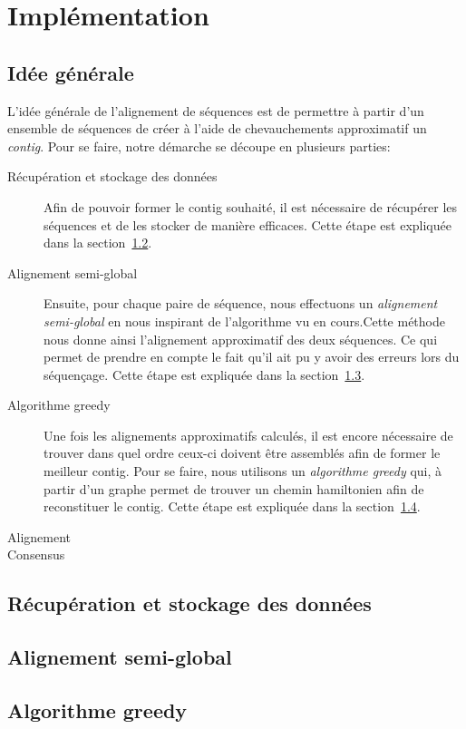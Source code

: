 \section{Implémentation}

\subsection{Idée générale}

	L'idée générale de l'alignement de séquences est de permettre à partir d'un ensemble de séquences de créer à l'aide de chevauchements approximatif un \emph{contig}. Pour se faire, notre démarche se découpe en plusieurs parties:
	
	\begin{description}
		\item[Récupération et stockage des données] Afin de pouvoir former le contig souhaité, il est nécessaire de récupérer les séquences et de les stocker de manière efficaces. Cette étape est expliquée dans la section~\ref{subsection:recStock}.
		
		\item[Alignement semi-global] Ensuite, pour chaque paire de séquence, nous effectuons un \emph{alignement semi-global} en nous inspirant de l'algorithme vu en cours.Cette méthode nous donne ainsi l'alignement approximatif des deux séquences. Ce qui permet de prendre en compte le fait qu'il ait pu y avoir des erreurs lors du séquençage. Cette étape est expliquée dans la section~\ref{subsection:semiGlobal}.
		
		\item[Algorithme greedy] Une fois les alignements approximatifs calculés, il est encore nécessaire de trouver dans quel ordre ceux-ci doivent être assemblés afin de former le meilleur contig. Pour se faire, nous utilisons un \emph{algorithme greedy} qui, à partir d'un graphe permet de trouver un chemin hamiltonien afin de reconstituer le contig. Cette étape est expliquée dans la section~\ref{subsection:greedy}.
		
		\item[Alignement]
		
		\item[Consensus]
		
	\end{description}

\subsection{Récupération et stockage des données}
\label{subsection:recStock}
	


\subsection{Alignement semi-global}
\label{subsection:semiGlobal}


\subsection{Algorithme greedy}
\label{subsection:greedy}

